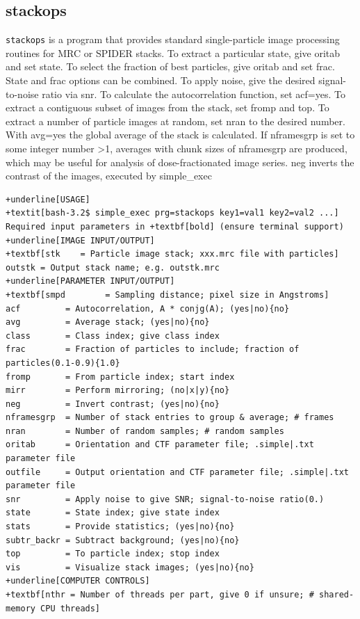 \documentclass[a4paper,11pt]{article}
\newcommand{\prgname}[1]{\textcolor{NavyBlue}{\texttt{#1}}}
\begin{document}
\subsection{stackops}
\label{stackops}
\prgname{stackops} is a program that provides standard single-particle image processing routines for MRC or SPIDER stacks. To extract a particular state, give oritab and set state. To select the fraction of best particles, give oritab and set frac. State and frac options can be combined. To apply noise, give the desired signal-to-noise ratio via snr. To calculate the autocorrelation function, set acf=yes. To extract a contiguous subset of images from the stack, set fromp and top. To extract a number of particle images at random, set nran to the desired number. With avg=yes the global average of the stack is calculated. If nframesgrp is set to some integer number >1, averages with chunk sizes of nframesgrp are produced, which may be useful for analysis of dose-fractionated image series. neg inverts the contrast of the images, executed by simple\_exec
\begin{Verbatim}[commandchars=+\[\],fontsize=\small,breaklines=true]
+underline[USAGE]
+textit[bash-3.2$ simple_exec prg=stackops key1=val1 key2=val2 ...]
Required input parameters in +textbf[bold] (ensure terminal support)
+underline[IMAGE INPUT/OUTPUT]
+textbf[stk    = Particle image stack; xxx.mrc file with particles]
outstk = Output stack name; e.g. outstk.mrc
+underline[PARAMETER INPUT/OUTPUT]
+textbf[smpd        = Sampling distance; pixel size in Angstroms]
acf         = Autocorrelation, A * conjg(A); (yes|no){no}
avg         = Average stack; (yes|no){no}
class       = Class index; give class index
frac        = Fraction of particles to include; fraction of particles(0.1-0.9){1.0}
fromp       = From particle index; start index
mirr        = Perform mirroring; (no|x|y){no}
neg         = Invert contrast; (yes|no){no}
nframesgrp  = Number of stack entries to group & average; # frames
nran        = Number of random samples; # random samples
oritab      = Orientation and CTF parameter file; .simple|.txt parameter file
outfile     = Output orientation and CTF parameter file; .simple|.txt parameter file
snr         = Apply noise to give SNR; signal-to-noise ratio(0.)
state       = State index; give state index
stats       = Provide statistics; (yes|no){no}
subtr_backr = Subtract background; (yes|no){no}
top         = To particle index; stop index
vis         = Visualize stack images; (yes|no){no}
+underline[COMPUTER CONTROLS]
+textbf[nthr = Number of threads per part, give 0 if unsure; # shared-memory CPU threads]
\end{Verbatim}
\end{document}
